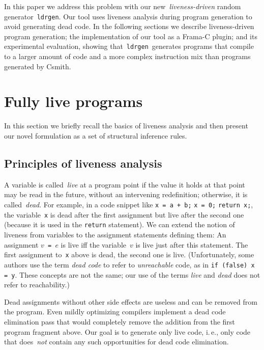 \documentclass{llncs}
\newcommand\ldrgen{\texttt{ldrgen}}
\begin{document}
In this paper we address this problem with our new~\emph{liveness-driven}
random generator~\ldrgen. Our tool uses liveness analysis during program
generation to avoid generating dead code. In the following sections we
describe liveness-driven program generation; the implementation of our tool
as a Frama-C plugin; and its experimental evaluation, showing that~\ldrgen\
generates programs that compile to a larger amount of code and a more
complex instruction mix than programs generated by Csmith.


\section{Fully live programs}

In this section we briefly recall the basics of liveness analysis and then
present our novel formulation as a set of structural inference rules.

\subsection{Principles of liveness analysis}

A variable is called~\emph{live} at a program point if the value it holds at
that point may be read in the future, without an intervening redefinition;
otherwise, it is called~\emph{dead}.
For example, in a code snippet like \verb|x = a + b;| \verb|x = 0;|
\verb|return x;|, the variable~\verb|x| is dead after the first assignment
but live after the second one (because it is used in the \verb|return|
statement). We can extend the notion of liveness from variables to the
assignment statements defining them: An assignment \(v\)\verb| = |\(e\) is
live iff the variable~\(v\) is live just after this statement. The
first assignment to~\verb|x| above is dead, the second one is live.
(Unfortunately, some authors
use the term \emph{dead code} to refer to \emph{unreachable} code, as in
\texttt{if (false) x = y}. These concepts are not the same; our use of the
terms \emph{live} and \emph{dead} does not refer to reachability.)

Dead assignments without other side effects are useless and can be removed
from the program. Even mildly optimizing compilers implement a dead code
elimination pass that would completely remove the addition from the first
program fragment above. Our goal is to generate only live code, i.\,e., only
code that does~\emph{not} contain any such opportunities for dead code
elimination.
\end{document}
